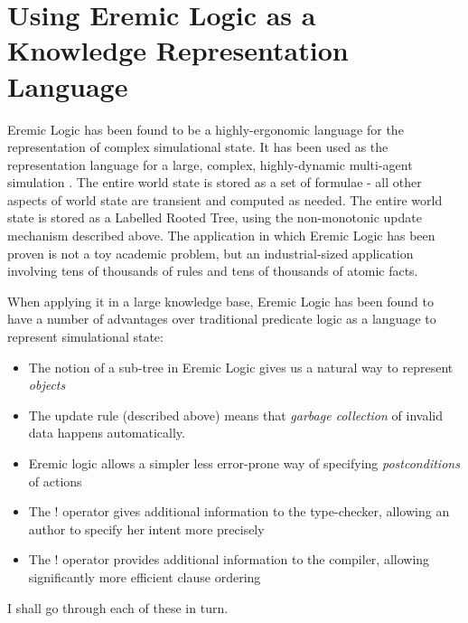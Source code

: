 \section{Using Eremic Logic as a Knowledge Representation Language}
Eremic Logic has been found to be a highly-ergonomic language for the representation of complex simulational state.
It has been used as the representation language for a large, complex, highly-dynamic multi-agent simulation \cite{evans-and-short}.
The entire world state is stored as a set of formulae - all other aspects of world state are transient and computed as needed.
The entire world state is stored as a Labelled Rooted Tree, using the non-monotonic update mechanism described above.
The application in which Eremic Logic has been proven is not a toy academic problem, but an industrial-sized application involving tens of thousands of rules and tens of thousands of atomic facts.

When applying it in a large knowledge base, Eremic Logic has been found to have a number of advantages over traditional predicate logic as a language to represent simulational state:
\begin{itemize}
\item
The notion of a sub-tree in Eremic Logic gives us a natural way to represent \emph{objects}
\item
The update rule (described above) means that \emph{garbage collection} of invalid data happens automatically.
\item
Eremic logic allows a simpler less error-prone way of specifying \emph{postconditions} of actions
\item
The $!$ operator gives additional information to the type-checker, allowing an author to specify her intent more precisely
\item
The $!$ operator provides additional information to the compiler, allowing significantly more efficient clause ordering
\end{itemize}
I shall go through each of these in turn.

